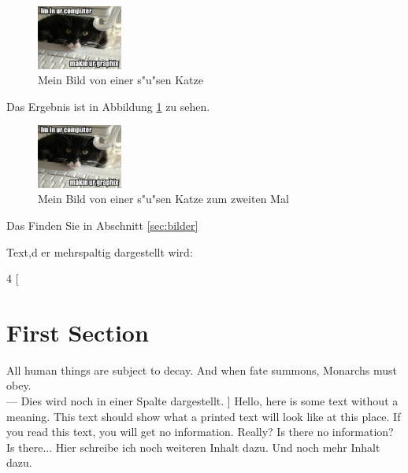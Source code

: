 \documentclass{article}
\begin{document}
	\begin{figure}[h]
	
		\begin{center}
	
		\includegraphics[width=0.25\textwidth]{Images/lolcat-sample.jpg}
		\caption{Mein Bild von einer s"u"sen Katze}
		\label{fig:katze}
	
		\end{center}

	\end{figure}


	Das Ergebnis ist in Abbildung \ref{fig:katze} zu sehen.


	\begin{figure}[h]
	
		\begin{center}
	
		\includegraphics[width=0.25\textwidth]{Images/lolcat-sample.jpg}
		\caption{Mein Bild von einer s"u"sen Katze zum zweiten Mal}
		\label{fig:katze2}
	
		\end{center}

	\end{figure}

	Das Finden Sie in Abschnitt \ref{sec:bilder}



	Text,d er mehrspaltig dargestellt wird:

 	\begin{multicols}{4}
	[
	\section{First Section}
	All human things are subject to decay. And when fate summons, Monarchs must obey. \\
	--- Dies wird noch in einer Spalte dargestellt.
 	]
	Hello, here is some text without a meaning.  This text should show what 
	a printed text will look like at this place.
	If you read this text, you will get no information.  Really?  Is there 
	no information?  Is there...
	Hier schreibe ich noch weiteren Inhalt dazu.
	Und noch mehr Inhalt dazu.
	\end{multicols}
   
\end{document}
